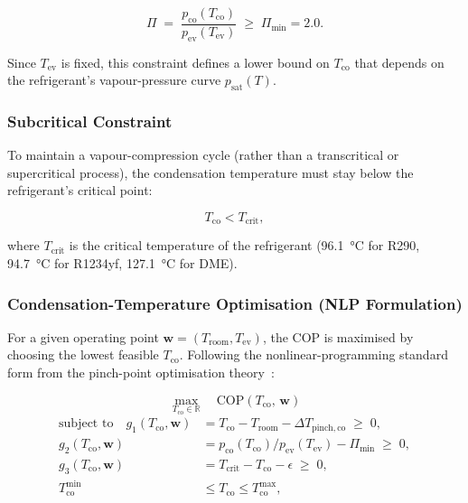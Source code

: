 \documentclass[12pt, a4paper]{article}
\newcommand{\Tco}{T_{\mathrm{co}}}
\newcommand{\Tev}{T_{\mathrm{ev}}}
\newcommand{\Troom}{T_{\mathrm{room}}}
\newcommand{\dTpin}[1]{\Delta T_{\mathrm{pinch,#1}}}
\begin{document}
\begin{equation}
  \Pi \;=\; \frac{p_{\mathrm{co}}(\Tco)}{p_{\mathrm{ev}}(\Tev)} \;\geq\; \Pi_{\min} = 2.0.
  \tag{C-pr}\label{eq:pressure_ratio}
\end{equation}

Since $\Tev$ is fixed, this constraint defines a lower bound on $\Tco$ that depends on
the refrigerant's vapour-pressure curve $p_{\mathrm{sat}}(T)$.

\subsubsection{Subcritical Constraint}

To maintain a vapour-compression cycle (rather than a transcritical or supercritical
process), the condensation temperature must stay below the refrigerant's critical point:

\begin{equation}
  \Tco < T_{\mathrm{crit}},
  \tag{C-sub}\label{eq:subcrit}
\end{equation}

where $T_{\mathrm{crit}}$ is the critical temperature of the refrigerant
(\SI{96.1}{\degreeCelsius} for R290, \SI{94.7}{\degreeCelsius} for R1234yf,
\SI{127.1}{\degreeCelsius} for DME).

\subsubsection{Condensation-Temperature Optimisation (NLP Formulation)}

For a given operating point $\mathbf{w} = (\Troom, \Tev)$, the COP is maximised by
choosing the lowest feasible $\Tco$.
Following the nonlinear-programming standard form from the pinch-point optimisation
theory~\cite{coolprop}:

\begin{equation}
  \max_{\Tco \in \mathbb{R}}
  \quad \mathrm{COP}(\Tco,\, \mathbf{w})
  \label{eq:nlp_obj}
\end{equation}
\vspace{-1em}
\begin{align}
  \text{subject to}\quad
  g_1(\Tco,\mathbf{w}) &= \Tco - \Troom - \dTpin{co} \;\geq\; 0,
    \tag{NLP-1}\label{eq:nlp1}\\
  g_2(\Tco,\mathbf{w}) &= p_{\mathrm{co}}(\Tco)/p_{\mathrm{ev}}(\Tev) - \Pi_{\min}
    \;\geq\; 0,
    \tag{NLP-2}\label{eq:nlp2}\\
  g_3(\Tco,\mathbf{w}) &= T_{\mathrm{crit}} - \Tco - \epsilon \;\geq\; 0,
    \tag{NLP-3}\label{eq:nlp3}\\[4pt]
  \Tco^{\min} &\leq \Tco \leq \Tco^{\max},
    \tag{NLP-bnd}\label{eq:nlp_bnd}
\end{align}
\end{document}
